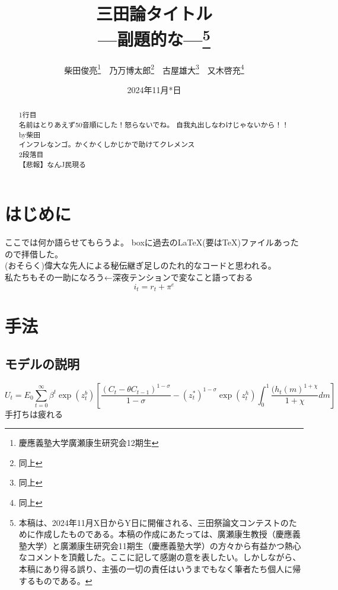\documentclass[dvipdfmx,autodetect-engine,11pt]{jsarticle}
\title{三田論タイトル\\---副題的な---\footnote{本稿は、2024年11月X日からY日に開催される、三田祭論文コンテストのために作成したものである。本稿の作成にあたっては、廣瀬康生教授（慶應義塾大学）と廣瀬康生研究会11期生（慶應義塾大学）の方々から有益かつ熱心なコメントを頂戴した。ここに記して感謝の意を表したい。しかしながら、本稿にあり得る誤り、主張の一切の責任はいうまでもなく筆者たち個人に帰するものである。}}
\author{柴田俊亮\footnote{慶應義塾大学廣瀬康生研究会12期生}　乃万博太郎\footnote{同上}　古屋雄大\footnote{同上}　又木啓充\footnote{同上}}
\date{2024年11月*日}
\begin{document}
\maketitle

\begin{abstract}
1行目\\
名前はとりあえず50音順にした！怒らないでね。
自我丸出しなわけじゃないから！！\\by柴田\\
インフレなンゴ。かくかくしかじかで助けてクレメンス\\
2段落目\\
【悲報】なんJ民現る\newline

\begin{center}
\end{center}


\end{abstract}

\newpage
\tableofcontents%
\newpage

\section{はじめに}

ここでは何か語らせてもらうよ。\newline
boxに過去の\LaTeX(要は\TeX)ファイルあったので拝借した。\\
(おそらく)偉大な先人による秘伝継ぎ足しのたれ的なコードと思われる。\\
私たちもその一助になろう←深夜テンションで変なこと語っておる\\


\begin{equation}
i_t = r_t + \pi^e
\end{equation}


\section{手法}
\subsection{モデルの説明}

\begin{equation}
    U_t = E_0\sum_{t=0}^{\infty}\beta^t\exp(z_t^b)[\frac{(C_t - \theta C_{t-1})^{1-\sigma}}{1-\sigma} - (z_t^*)^{1-\sigma}\exp(z_t^h)\int_0^1\frac{(h_t(m)^{1+\chi}}{1 + \chi}dm]
\end{equation}
手打ちは疲れる
\end{document}
